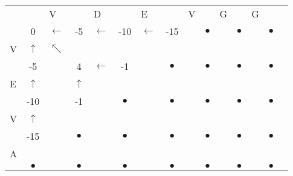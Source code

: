 \documentclass[landscape]{foils}
\begin{document}
\myNewSlide
{
\normalsize
\begin{center}
\begin{tabular}{lclclclclclclcl}
   &              & V             &  & D & & E & & V & & G & & G \\   
   & {\color{black} 0}      & {\color{green}$\leftarrow$}   & -5 &   {\color{green}$\leftarrow$} & -10 &   {\color{green}$\leftarrow$} & -15 &    & {\color{black}$\bullet$}&    & {\color{black}$\bullet$}&    & {\color{black}$\bullet$} \\
V  & {\color{green} $\uparrow$} & {\color{green}$\nwarrow$}    & {\color{black} $$ } &     & {\color{black} $$ } & {\color{black} $$} &     & {\color{black} $$ } &     & {\color{black} $$ } & {\color{black} $$} &     & {\color{black} $$ } &       \\
   & -5     &  & 4        &   {\color{green}$\leftarrow$} & -1 &    & {\color{black}$\bullet$}&    & {\color{black}$\bullet$}&    & {\color{black}$\bullet$}&    & {\color{black}$\bullet$} \\
E  & {\color{green} $\uparrow$} &     & {\color{green} $\uparrow$ } &     & {\color{black} $$ } & {\color{black} $$} &     & {\color{black} $$ } &     & {\color{black} $$ } & {\color{black} $$} &     & {\color{black} $$ } &       \\
   & -10 &    & -1        &    & {\color{black}$\bullet$} &    & {\color{black}$\bullet$}&    & {\color{black}$\bullet$}&    & {\color{black}$\bullet$}&    & {\color{black}$\bullet$} \\
V  & {\color{green} $\uparrow$} &     & {\color{black} $$ } &     & {\color{black} $$ } & {\color{black} $$} &     & {\color{black} $$ } &     & {\color{black} $$ } & {\color{black} $$} &     & {\color{black} $$ } &       \\
   & -15      &    & {\color{black} $\bullet$}        &    & {\color{black}$\bullet$} &    & {\color{black}$\bullet$}&    & {\color{black}$\bullet$}&    & {\color{black}$\bullet$}&    & {\color{black}$\bullet$} \\
A  & {\color{black} $$} &     & {\color{black} $$ } &     & {\color{black} $$ } & {\color{black} $$} &     & {\color{black} $$ } &     & {\color{black} $$ } & {\color{black} $$} &     & {\color{black} $$ } &       \\
   & {\color{black} $\bullet$}      &    & {\color{black} $\bullet$}        &    & {\color{black}$\bullet$} &    & {\color{black}$\bullet$}&    & {\color{black}$\bullet$}&    & {\color{black}$\bullet$}&    & {\color{black}$\bullet$} \\

\end{tabular}
\end{center}}
\end{document}
